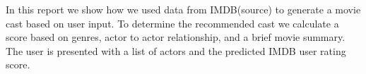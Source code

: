 In this report we show how we used data from IMDB(source) to generate a movie cast based on user input. To determine the 
recommended cast we calculate a score based on genres, actor to actor relationship, and a brief movie summary. The user
is presented with a list of actors and the predicted IMDB user rating score.